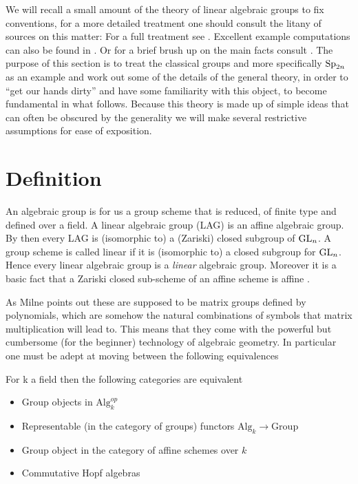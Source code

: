 We will recall a small amount of the theory of linear algebraic groups to fix conventions, for a more detailed treatment one should consult the litany of sources on this matter: For a full treatment see \cite{milneAlgebraicGroupsTheory2017}\cite{milneLieAlgebrasAlgebraic}\cite{milneBasicTheoryAffine}\cite{springerLinearAlgebraicGroups1998}. Excellent example computations can also be found in \cite{BuildingsClassicalGroups}\cite{makisumiStructureTheoryReductive}\cite{malleLinearAlgebraicGroups}\cite{NotesClassAlgebraic}. Or for a brief brush up on the main facts consult \cite[I.I.1]{borelAutomorphicFormsRepresentations1979}. The purpose of this section is to treat the classical groups and more specifically \(\operatorname{Sp}_{2n}\) as an example and work out some of the details of the general theory, in order to ``get our hands dirty'' and have some familiarity with this object, to become fundamental in what follows. Because this theory is made up of simple ideas that can often be obscured by the generality we will make several restrictive assumptions for ease of exposition. 

\section{Definition}
An algebraic group is for us a group scheme that is reduced, of finite type and defined over a field. A linear algebraic group (LAG) is an affine algebraic group.
By \cite[2.3.7(i)]{springerLinearAlgebraicGroups1998} then every LAG is (isomorphic to) a (Zariski) closed subgroup of \(\operatorname{GL}_n\). A group scheme is called linear if it is (isomorphic to) a closed subgroup for \(\operatorname{GL}_n\). Hence every linear algebraic group is a \textit{linear} algebraic group. Moreover it is a basic fact that a Zariski closed sub-scheme of an affine scheme is affine \cite[II.5.T3]{mumfordRedBookVarieties1999}.

As Milne points out \cite[Abstract]{milneAlgebraicGroupsTheory2017} these are supposed to be matrix groups defined by polynomials, which are somehow the natural combinations of symbols that matrix multiplication will lead to. This means that they come with the powerful but cumbersome (for the beginner) technology of algebraic geometry. In particular one must be adept at moving between the following equivalences
\begin{Theorem}
    For k a field then the following categories are equivalent
    \begin{itemize}
        \item Group objects in \(\mathrm{Alg}_k^{op}\)
        \item Representable (in the category of groups) functors \(\mathrm{Alg}_k \to \mathrm{Group}\)
        \item Group object in the category of affine schemes over \(k\)
        \item Commutative Hopf algebras
    \end{itemize}
\end{Theorem}

